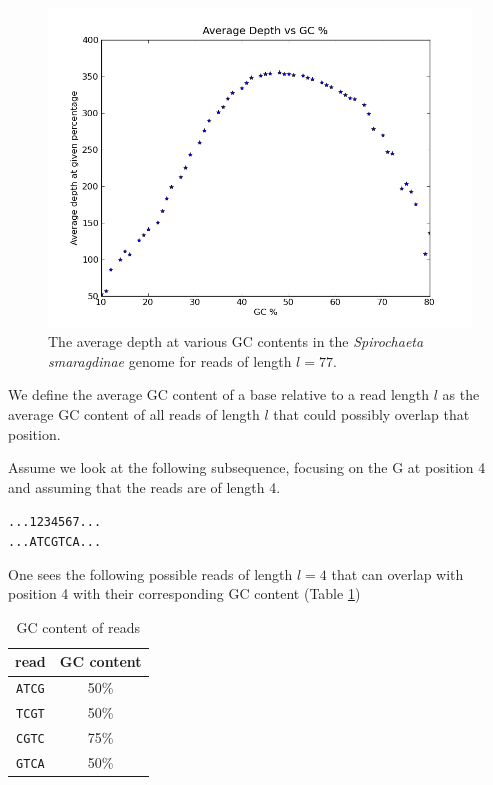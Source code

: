 \documentclass[phd,tocprelim]{cornell}
\begin{document}
\begin{figure}[!tpb]%
    \centerline{\includegraphics[width=\textwidth]{figures/ALE/avgDepthVsGC.png}}
    \caption[Average depth vs. GC content]{The average depth at various GC contents in the {\it Spirochaeta smaragdinae} genome for reads of length $l = 77$.}\label{fig:GC1}
\end{figure}

We define the average GC content of a base relative to a read length $l$ as the average GC content of all reads of length $l$ that could possibly overlap that position.

Assume we look at the following subsequence, focusing on the G at position 4 and assuming that the reads are of length 4.

\singlespacing
\begin{center}
\texttt{...1234567...\\
...ATCGTCA...}
\end{center}
\normalspacing

One sees the following possible reads of length $l=4$ that can overlap with position 4 with their corresponding GC content (Table \ref{GCcontTable})

\pagebreak

\begin{table}[h]
    \label{GCcontTable}
    \caption{GC content of reads}
\begin{center}
\begin{tabular}{c|c}
    read & GC content \\
    \hline
    \texttt{ATCG} & 50\% \\
    \texttt{TCGT} & 50\% \\
    \texttt{CGTC} & 75\% \\
    \texttt{GTCA} & 50\%
\end{tabular}
\end{center}
\end{table}
\end{document}
